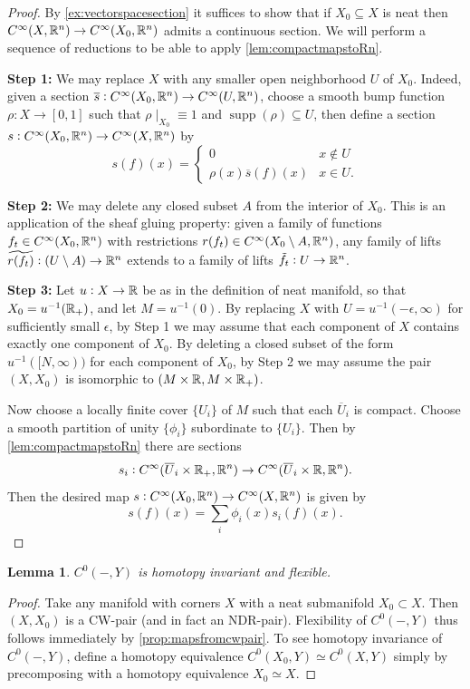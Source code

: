 \documentclass{article}
\newtheorem{lemma}[theorem]{Lemma}
\newtheorem{proposed work}[theorem]{Proposed Work}
\theoremstyle{definition}
\begin{document}
\begin{proof}
  By \ref{ex:vectorspacesection} it suffices to show that if
  $X_0\subseteq X$ is neat then
  $C^\infty(X,\mathbb R^n) \to C^\infty(X_0, \mathbb R^n)$ admits a continuous
  section. We will perform a sequence of reductions to be able to
  apply \ref{lem:compactmapstoRn}.

  {\bf Step 1:} We may replace $X$ with any smaller open neighborhood
  $U$ of $X_0$. Indeed, given a section $\overline s: C^\infty(X_0,
  \mathbb R^n) \to C^\infty(U, \mathbb R^n)$, choose a smooth bump function
  $\rho: X\to [0,1]$ such that $\rho\mid_{X_0} \equiv 1$ and
  $\operatorname{supp}(\rho)\subseteq U$, then define a section
  $s:C^\infty(X_0, \mathbb R^n) \to C^\infty(X, \mathbb R^n)$ by
  \[
    s(f)(x) = \begin{cases} 0 &x\notin U\\ \rho(x) \overline s(f)(x) & x\in
      U. 
    \end{cases}
  \]

  {\bf Step 2:} We may delete any closed subset $A$ from the interior
  of $X_0$. This is an application of the sheaf gluing property: given
  a family of functions $f_t \in C^\infty(X_0, \mathbb R^n)$ with
  restrictions $r(f_t) \in C^\infty(X_0\setminus A, \mathbb R^n)$, any family
  of lifts $\widetilde{r(f_t)} : (U\setminus A)\to \mathbb R^n$ extends to a
  family of lifts $\tilde f_t : U\to \mathbb R^n$.

  {\bf Step 3:} Let $u:X\to \mathbb R$ be as in the definition of neat
  manifold, so that $X_0 = u^{-1}(\mathbb R_+)$, and let $M = u^{-1}(0)$. By
  replacing $X$ with $U = u^{-1}(-\epsilon,\infty)$ for sufficiently
  small $\epsilon$, by Step 1 we may assume that each component of $X$
  contains exactly one component of $X_0$. By deleting a closed subset
  of the form $u^{-1}([N,\infty))$ for each component of $X_0$, by
  Step 2 we may assume the pair $(X, X_0)$ is isomorphic to $(M\times
  \mathbb R, M\times \mathbb R_+)$.

  Now choose a locally finite cover $\{U_i\}$ of $M$ such that each
  $\overline U_i$ is compact. Choose a smooth partition of unity
  $\{\phi_i\}$ subordinate to $\{U_i\}$. Then by
  \ref{lem:compactmapstoRn} there are sections 
  \[ s_i : C^\infty(\overline U_i\times \mathbb R_+, \mathbb R^n) \to C^\infty(\overline
    U_i\times \mathbb R, \mathbb R^n).\]
  Then the desired map $s: C^\infty(X_0,\mathbb R^n) \to C^\infty(X, \mathbb R^n)$
  is given by
  \[
    s(f)(x) = \sum_i \phi_i(x) s_i(f)(x).
  \]
\end{proof}

\begin{lemma} \label{lem:c0functorisnice}
  $C^0(-, Y)$ is homotopy invariant and flexible.
\end{lemma}
\begin{proof}
  Take any manifold with corners $X$ with a neat submanifold
  $X_0 \subset X$. Then $(X, X_0)$ is a CW-pair (and in fact an
  NDR-pair).
  Flexibility of $C^0(-,Y)$ thus follows immediately by
  \ref{prop:mapsfromcwpair}. To see homotopy invariance of $C^0(-,Y)$,
  define a homotopy equivalence $C^0(X_0, Y) \simeq C^0(X,Y)$ simply
  by precomposing with a homotopy equivalence $X_0 \simeq X$.
\end{proof}
\end{document}

